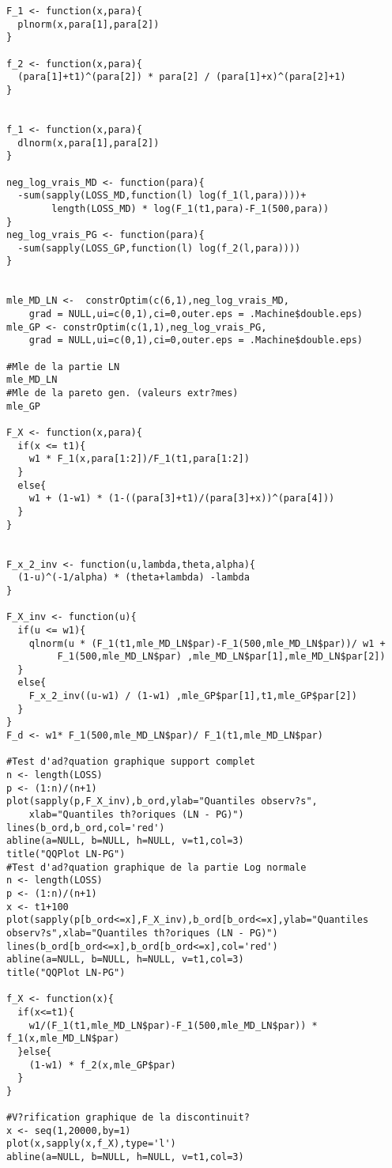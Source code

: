 \begin{verbatim}
F_1 <- function(x,para){
  plnorm(x,para[1],para[2])
}

f_2 <- function(x,para){
  (para[1]+t1)^(para[2]) * para[2] / (para[1]+x)^(para[2]+1)
}


f_1 <- function(x,para){
  dlnorm(x,para[1],para[2])
}

neg_log_vrais_MD <- function(para){
  -sum(sapply(LOSS_MD,function(l) log(f_1(l,para))))+
  		length(LOSS_MD) * log(F_1(t1,para)-F_1(500,para))
}
neg_log_vrais_PG <- function(para){
  -sum(sapply(LOSS_GP,function(l) log(f_2(l,para))))
}


mle_MD_LN <-  constrOptim(c(6,1),neg_log_vrais_MD,
	grad = NULL,ui=c(0,1),ci=0,outer.eps = .Machine$double.eps)
mle_GP <- constrOptim(c(1,1),neg_log_vrais_PG,
	grad = NULL,ui=c(0,1),ci=0,outer.eps = .Machine$double.eps)

#Mle de la partie LN
mle_MD_LN
#Mle de la pareto gen. (valeurs extr?mes)
mle_GP

F_X <- function(x,para){
  if(x <= t1){
    w1 * F_1(x,para[1:2])/F_1(t1,para[1:2])
  }
  else{
    w1 + (1-w1) * (1-((para[3]+t1)/(para[3]+x))^(para[4]))
  }  
}


F_x_2_inv <- function(u,lambda,theta,alpha){
  (1-u)^(-1/alpha) * (theta+lambda) -lambda
}

F_X_inv <- function(u){
  if(u <= w1){
    qlnorm(u * (F_1(t1,mle_MD_LN$par)-F_1(500,mle_MD_LN$par))/ w1 +
    	 F_1(500,mle_MD_LN$par) ,mle_MD_LN$par[1],mle_MD_LN$par[2])
  }
  else{
    F_x_2_inv((u-w1) / (1-w1) ,mle_GP$par[1],t1,mle_GP$par[2])
  }  
}
F_d <- w1* F_1(500,mle_MD_LN$par)/ F_1(t1,mle_MD_LN$par)

#Test d'ad?quation graphique support complet
n <- length(LOSS)
p <- (1:n)/(n+1)
plot(sapply(p,F_X_inv),b_ord,ylab="Quantiles observ?s",
	xlab="Quantiles th?oriques (LN - PG)")
lines(b_ord,b_ord,col='red')
abline(a=NULL, b=NULL, h=NULL, v=t1,col=3)
title("QQPlot LN-PG")
#Test d'ad?quation graphique de la partie Log normale
n <- length(LOSS)
p <- (1:n)/(n+1)
x <- t1+100
plot(sapply(p[b_ord<=x],F_X_inv),b_ord[b_ord<=x],ylab="Quantiles observ?s",xlab="Quantiles th?oriques (LN - PG)")
lines(b_ord[b_ord<=x],b_ord[b_ord<=x],col='red')
abline(a=NULL, b=NULL, h=NULL, v=t1,col=3)
title("QQPlot LN-PG")

f_X <- function(x){
  if(x<=t1){
    w1/(F_1(t1,mle_MD_LN$par)-F_1(500,mle_MD_LN$par)) * f_1(x,mle_MD_LN$par)
  }else{
    (1-w1) * f_2(x,mle_GP$par)
  }
}

#V?rification graphique de la discontinuit?
x <- seq(1,20000,by=1)
plot(x,sapply(x,f_X),type='l')
abline(a=NULL, b=NULL, h=NULL, v=t1,col=3)


\end{verbatim}

